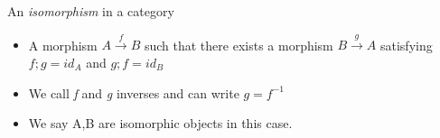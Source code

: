 
An \emph{isomorphism} in a category

\begin{itemize}
    \item A morphism $A \xrightarrow{f}B$ such that there exists a morphism $B \xrightarrow{g}A$ satisfying $f;g=id_A$ and $g;f=id_B$
    \item We call \emph{f} and \emph{g} inverses and can write $g=f^{-1}$
    \item We say A,B are isomorphic objects in this case.
\end{itemize}
